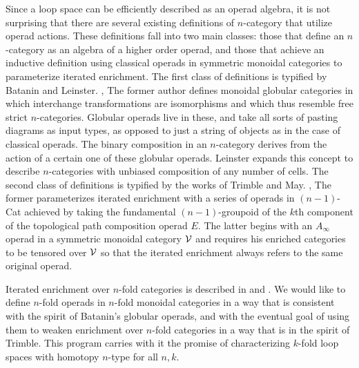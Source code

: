 \documentclass{tac}
\begin{document}
{            Since a loop space can be efficiently described as an operad algebra, it is not surprising that there are 
            several existing definitions of $n$-category that utilize operad actions. These definitions fall into two main
            classes: those that define an $n$-category as an algebra of a higher order operad, and those that
            achieve an inductive definition using classical operads in symmetric monoidal categories to 
            parameterize iterated enrichment. The first class of definitions is typified by Batanin and Leinster.
            \cite{bat},\cite{lst}
            The
            former author defines monoidal globular categories in which interchange transformations are 
            isomorphisms and which thus resemble free strict $n$-categories.
             Globular operads live in these, and take all sorts of pasting diagrams
            as input types, as opposed to just a string of objects as in the case of classical operads.
            The binary composition in an $n$-category derives from the action of a certain one  
            of these globular operads.
            Leinster expands this concept to describe $n$-categories with unbiased composition of any number
            of cells.
            The second class of definitions is typified by the works of Trimble and May. 
            \cite{may2}, \cite{trimble}
            The former 
            parameterizes iterated enrichment with
            a series of operads in $(n-1)$-Cat achieved by taking the fundamental $(n-1)$-groupoid
            of the $k$th component of the topological path composition operad $E.$ 
            The latter begins with an $A_{\infty}$ operad in a symmetric
            monoidal category ${\cal V}$ and requires his enriched categories to be tensored over ${\cal V}$ so
            that the iterated enrichment always refers to the same original operad.
            
            Iterated enrichment over $n$-fold categories is described in \cite{forcey1} and \cite{forcey2}.
            We would like to define $n$-fold 
            operads in $n$-fold monoidal categories in a way that is 
            consistent with the spirit of Batanin's globular operads,
            and with the eventual goal of using them to weaken enrichment over $n$-fold categories
            in a way that is in the spirit of Trimble.
            This program carries with it the promise of characterizing $k$-fold loop spaces with homotopy $n$-type
            for all $n,k.$
            
}
\end{document}
